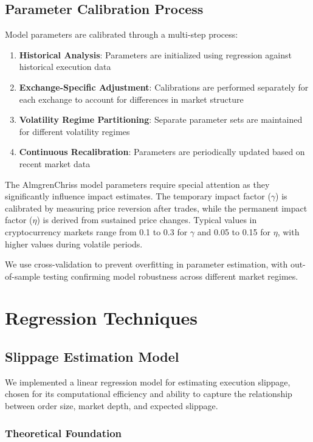 \documentclass[10pt,twocolumn,a4paper]{IEEEtran}
\begin{document}
\subsection{Parameter Calibration Process}

Model parameters are calibrated through a multi-step process:

\begin{enumerate}
    \item \textbf{Historical Analysis}: Parameters are initialized using regression against historical execution data
    \item \textbf{Exchange-Specific Adjustment}: Calibrations are performed separately for each exchange to account for differences in market structure
    \item \textbf{Volatility Regime Partitioning}: Separate parameter sets are maintained for different volatility regimes
    \item \textbf{Continuous Recalibration}: Parameters are periodically updated based on recent market data
\end{enumerate}

The AlmgrenChriss model parameters require special attention as they significantly influence impact estimates. The temporary impact factor ($\gamma$) is calibrated by measuring price reversion after trades, while the permanent impact factor ($\eta$) is derived from sustained price changes. Typical values in cryptocurrency markets range from 0.1 to 0.3 for $\gamma$ and 0.05 to 0.15 for $\eta$, with higher values during volatile periods.

We use cross-validation to prevent overfitting in parameter estimation, with out-of-sample testing confirming model robustness across different market regimes.

\section{Regression Techniques}

\subsection{Slippage Estimation Model}

We implemented a linear regression model for estimating execution slippage, chosen for its computational efficiency and ability to capture the relationship between order size, market depth, and expected slippage.

\subsubsection{Theoretical Foundation}
\end{document}

